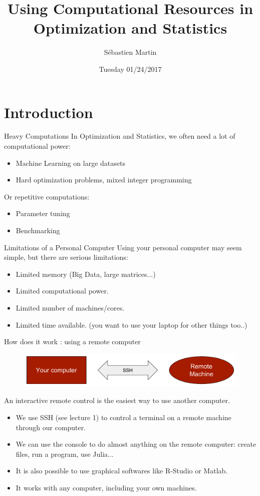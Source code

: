 \documentclass{beamer}
\title[IAP-2017]{Using Computational Resources in Optimization and Statistics}
\author{Sébastien Martin}
\institute{MIT}
\date{Tuesday 01/24/2017}
\begin{document}
\begin{frame}
  \titlepage
\end{frame}


\section{Introduction}

\begin{frame}{Heavy Computations}
  In Optimization and Statistics, we often need a lot of computational power:
  \begin{itemize}
    \item Machine Learning on large datasets
    \item Hard optimization problems, mixed integer programming
  \end{itemize}
  \pause
  Or repetitive computations:
  \begin{itemize}
    \item Parameter tuning
    \item Benchmarking
  \end{itemize}
\end{frame}

\begin{frame}{Limitations of a Personal Computer}
  Using your personal computer may seem simple, but there are serious limitations:
  \begin{itemize}
    \item<1-> Limited \alert{memory} (Big Data, large matrices...)
    \item<2-> Limited \alert{computational power}.
    \item<3-> Limited \alert{number of machines}/cores.
    \item<4-> Limited \alert{time} available. (you want to use your laptop for other things too..)
  \end{itemize}
\end{frame}

\begin{frame}{How does it work : using a remote computer}
  \begin{figure}
    \includegraphics[width=\linewidth]{figures/iap2017-diagram1}
  \end{figure}
  An interactive remote control is the easiest way to use another computer.
  \begin{itemize}
    \item We use \alert{SSH} (see lecture 1) to control a terminal on a remote machine through our computer.
    \item We can use the \alert{console} to do almost anything on the remote computer: create files, run a program, use Julia...
    \item It is also possible to use graphical softwares like \alert{R-Studio or Matlab}.
    \item It works with any computer, including your own machines.
  \end{itemize}
\end{frame}
\end{document}
